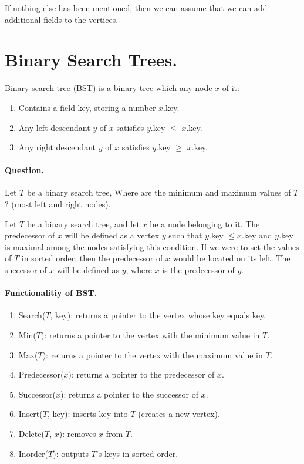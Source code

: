 If nothing else has been mentioned, then we can assume that we can add additional fields to the vertices.


\section{Binary Search Trees.} Binary search tree (BST) is a binary tree which any node $x$ of it: 
\begin{enumerate}
  \item Contains a field key, storing a number $x$.key. 
  \item Any left descendant $y$ of $x$ satisfies $y$.key $\le$ $x$.key. 
  \item Any right descendant $y$ of $x$ satisfies $y$.key $\ge$ $x$.key. 
\end{enumerate}

\paragraph{Question.} Let $T$ be a binary search tree, Where are the minimum and maximum values of $T$? (most left and right nodes). 

\begin{definition}
Let $T$ be a binary search tree, and let $x$ be a node belonging to it. The predecessor of $x$ will be defined as a vertex $y$ such that $y$.key $\leq x$.key and $y$.key is maximal among the nodes satisfying this condition. If we were to set the values of $T$ in sorted order, then the predecessor of $x$ would be located on its left. The successor of $x$ will be defined as $y$, where $x$ is the predecessor of $y$.
\end{definition}

\paragraph{Functionalitiy of BST.}
\begin{enumerate}
\item Search($T$, key): returns a pointer to the vertex whose key equals key. 
  \item Min($T$): returns a pointer to the vertex with the minimum value in $T$.  
  \item Max($T$): returns a pointer to the vertex with the maximum value in $T$.  
  \item Predecessor($x$): returns a pointer to the predecessor of $x$.  
  \item Successor($x$): returns a pointer to the successor of $x$. 
  \item Insert($T$, key): inserts key into $T$ (creates a new vertex).   
  \item Delete($T$, $x$): removes $x$ from $T$. 
  \item Inorder($T$): outputs $T$'s keys in sorted order.

\end{enumerate}


